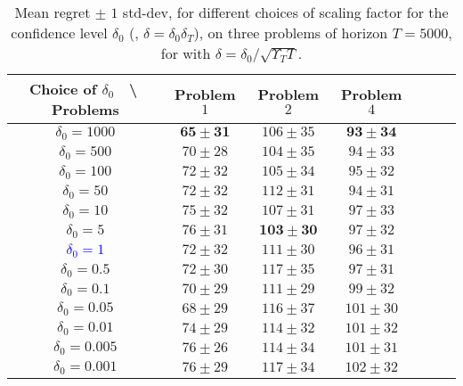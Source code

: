 \begin{small} %
\begin{table}[ht]
    \begin{small} %
    \centering
    \begin{tabular}{c|cccccc}
        \textbf{Choice of} $\delta_0$ $\;$ \textbackslash $\;$ \textbf{Problems} & Problem $1$ & Problem $2$ & Problem $4$ \\
        \hline
        $\delta_0=1000$       & $\mathbf{65 \pm 31}$ & $106 \pm 35$ & $\mathbf{93 \pm 34}$ \\
        $\delta_0=500$        & $70 \pm 28$ & $104 \pm 35$ & $94 \pm 33$ \\
        $\delta_0=100$        & $72 \pm 32$ & $105 \pm 34$ & $95 \pm 32$ \\
        $\delta_0=50$         & $72 \pm 32$ & $112 \pm 31$ & $94 \pm 31$ \\
        $\delta_0=10$         & $75 \pm 32$ & $107 \pm 31$ & $97 \pm 33$ \\
        $\delta_0=5$          & $76 \pm 31$ & $\mathbf{103 \pm 30}$ & $97 \pm 32$ \\
        \textcolor{blue}{$\delta_0=1$}  & $72 \pm 32$ & $111 \pm 30$ & $96 \pm 31$ \\
        $\delta_0=0.5$        & $72 \pm 30$ & $117 \pm 35$ & $97 \pm 31$ \\
        $\delta_0=0.1$        & $70 \pm 29$ & $111 \pm 29$ & $99 \pm 32$ \\
        $\delta_0=0.05$       & $68 \pm 29$ & $116 \pm 37$ & $101 \pm 30$ \\
        $\delta_0=0.01$       & $74 \pm 29$ & $114 \pm 32$ & $101 \pm 32$ \\
        $\delta_0=0.005$      & $76 \pm 26$ & $114 \pm 34$ & $101 \pm 31$ \\
        $\delta_0=0.001$      & $76 \pm 29$ & $117 \pm 34$ & $102 \pm 32$
    \end{tabular}
    \caption{Mean regret $\pm$ $1$ std-dev, for different choices of scaling factor for the confidence level $\delta_0$ (\ie, $\delta=\delta_0 \delta_T$), on three problems of horizon $T=5000$, for \GLRklUCB{} with $\delta=\delta_0 / \sqrt{\Upsilon_T T}$.}
    \label{table:6:sensibilityDelta}
    \end{small} %
\end{table}
\end{small} %


